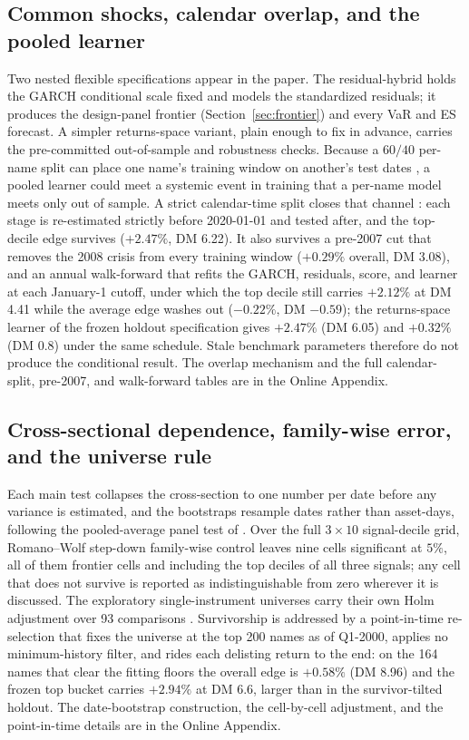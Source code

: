 \documentclass[11pt]{article}
\theoremstyle{remark}
\begin{document}
\subsection{Common shocks, calendar overlap, and the pooled learner}
\label{sec:calendarleak}

Two nested flexible specifications appear in the paper. The
residual-hybrid holds the GARCH conditional scale fixed and models the
standardized residuals; it produces the design-panel frontier
(Section~\ref{sec:frontier}) and every VaR and ES forecast. A simpler
returns-space variant, plain enough to fix in advance, carries the
pre-committed out-of-sample and robustness checks. Because a $60/40$
per-name split can place one name's training window on another's test
dates \citep{lopezdeprado2018}, a pooled learner could meet a systemic
event in training that a per-name model meets only out of sample. A
strict calendar-time split closes that channel \citep{gukellyxiu2020}:
each stage is re-estimated strictly before 2020-01-01 and tested after,
and the top-decile edge survives ($+2.47\%$, DM 6.22). It also survives a
pre-2007 cut that removes the 2008 crisis from every training window
($+0.29\%$ overall, DM 3.08), and an annual walk-forward that refits the
GARCH, residuals, score, and learner at each January-1 cutoff, under
which the top decile still carries $+2.12\%$ at DM 4.41 while the average
edge washes out ($-0.22\%$, DM $-0.59$); the returns-space learner of the frozen holdout specification gives $+2.47\%$ (DM 6.05) and $+0.32\%$ (DM 0.8) under the same schedule. Stale benchmark parameters therefore do not
produce the conditional result. The overlap mechanism and the full
calendar-split, pre-2007, and walk-forward tables are in the Online
Appendix.

\subsection{Cross-sectional dependence, family-wise error, and the
universe rule}
\label{sec:fwer}

Each main test collapses the cross-section to one number per date before
any variance is estimated, and the bootstraps resample dates rather than
asset-days, following the pooled-average panel test of
\citet{qutimmermannzhu2024}. Over the full $3\times10$ signal-decile
grid, Romano--Wolf step-down family-wise control
\citep{romanowolf2005, romanowolf2016} leaves nine cells significant at
$5\%$, all of them frontier cells and including the top deciles of all
three signals; any cell that does not survive is reported as
indistinguishable from zero wherever it is discussed. The exploratory
single-instrument universes carry their own Holm adjustment over 93
comparisons \citep{holm1979}. Survivorship is addressed by a
point-in-time re-selection that fixes the universe at the top 200 names
as of Q1-2000, applies no minimum-history filter, and rides each
delisting return to the end: on the 164 names that clear the fitting
floors the overall edge is $+0.58\%$ (DM 8.96) and the frozen top bucket
carries $+2.94\%$ at DM 6.6, larger than in the survivor-tilted holdout.
The date-bootstrap construction, the cell-by-cell adjustment, and the
point-in-time details are in the Online Appendix.
\end{document}
